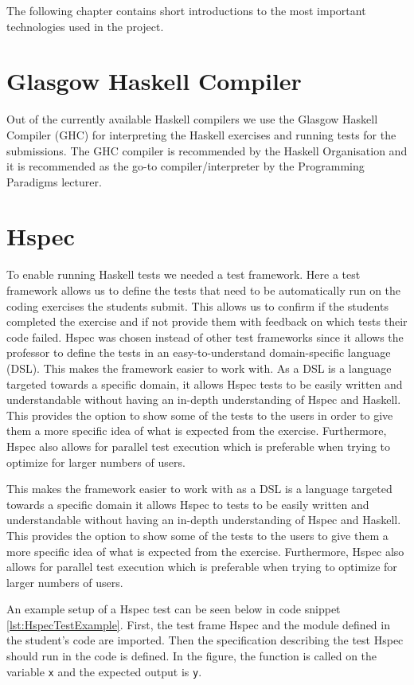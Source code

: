 The following chapter contains short introductions to the most important technologies used in the project.

\section*{Glasgow Haskell Compiler}
Out of the currently available Haskell compilers we use the Glasgow Haskell Compiler (GHC) for interpreting the Haskell exercises and running tests for the submissions. The GHC compiler is recommended by the Haskell Organisation and it is recommended as the go-to compiler/interpreter by the Programming Paradigms lecturer\cite{Haskell_GHC}.


\section*{Hspec}
To enable running Haskell tests we needed a test framework. Here a test framework allows us to define the tests that need to be automatically run on the coding exercises the students submit. This allows us to confirm if the students completed the exercise and if not provide them with feedback on which tests their code failed.
Hspec was chosen instead of other test frameworks since it allows the professor to define the tests in an easy-to-understand domain-specific language (DSL).
This makes the framework easier to work with. As a DSL is a language targeted towards a specific domain, it allows Hspec tests to be easily written and understandable without having an in-depth understanding of Hspec and Haskell.
This provides the option to show some of the tests to the users in order to give them a more specific idea of what is expected from the exercise.
Furthermore, Hspec also allows for parallel test execution which is preferable when trying to optimize for larger numbers of users\cite{Hspec_landing}.

This makes the framework easier to work with as a DSL is a language targeted towards a specific domain it allows Hspec to tests to be easily written and understandable without having an in-depth understanding of Hspec and Haskell.
This provides the option to show some of the tests to the users to give them a more specific idea of what is expected from the exercise.
Furthermore, Hspec also allows for parallel test execution which is preferable when trying to optimize for larger numbers of users.

An example setup of a Hspec test can be seen below in code snippet \ref{lst:HspecTestExample}. First, the test frame Hspec and the module defined in the student's code are imported. Then the specification describing the test Hspec should run in the code is defined. In the figure, the function is called on the variable \texttt{x} and the expected output is \texttt{y}.


